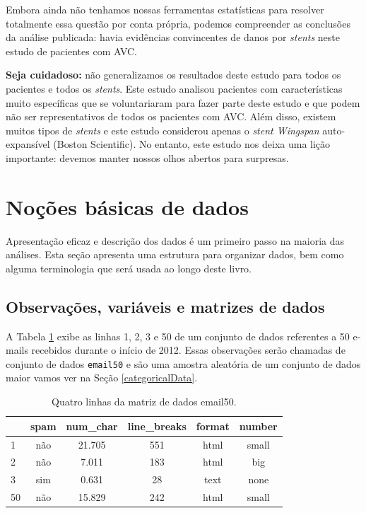 \documentclass[
]{book}
\theoremstyle{definition}
\theoremstyle{definition}
\theoremstyle{definition}
\theoremstyle{definition}
\theoremstyle{remark}
\begin{document}
Embora ainda não tenhamos nossas ferramentas estatísticas para resolver totalmente essa questão por conta própria, podemos compreender as conclusões da análise publicada: havia evidências convincentes de danos por \emph{stents} neste estudo de pacientes com AVC.

\textbf{Seja cuidadoso:} não generalizamos os resultados deste estudo para todos os pacientes e todos os \emph{stents}. Este estudo analisou pacientes com características muito específicas que se voluntariaram para fazer parte deste estudo e que podem não ser representativos de todos os pacientes com AVC. Além disso, existem muitos tipos de \emph{stents} e este estudo considerou apenas o \emph{stent Wingspan} auto-expansível (Boston Scientific). No entanto, este estudo nos deixa uma lição importante: devemos manter nossos olhos abertos para surpresas.

\hypertarget{dataBasics}{%
\section{Noções básicas de dados}\label{dataBasics}}

Apresentação eficaz e descrição dos dados é um primeiro passo na maioria das análises. Esta seção apresenta uma estrutura para organizar dados, bem como alguma terminologia que será usada ao longo deste livro.

\hypertarget{observationsVariableData}{%
\subsection{Observações, variáveis e matrizes de dados}\label{observationsVariableData}}

A Tabela \ref{tab:email50DF} exibe as linhas 1, 2, 3 e 50 de um conjunto de dados referentes a 50 e-mails recebidos durante o início de 2012. Essas observações serão chamadas de conjunto de dados \texttt{email50} e são uma amostra aleatória de um conjunto de dados maior vamos ver na Seção \ref{categoricalData}.

\begin{table}

\caption{\label{tab:email50DF}Quatro linhas da matriz de dados email50.}
\centering
\begin{tabular}[t]{l|c|c|c|c|c}
\hline
  & spam & num\_char & line\_breaks & format & number\\
\hline
1 & não & 21.705 & 551 & html & small\\
\hline
2 & não & 7.011 & 183 & html & big\\
\hline
3 & sim & 0.631 & 28 & text & none\\
\hline
50 & não & 15.829 & 242 & html & small\\
\hline
\end{tabular}
\end{table}
\end{document}
